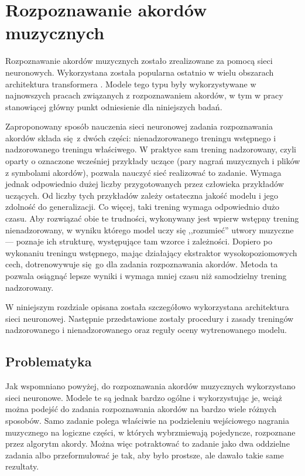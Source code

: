 \chapter{Rozpoznawanie akordów muzycznych}


Rozpoznawanie akordów muzycznych zostało zrealizowane za pomocą sieci neuronowych. Wykorzystana
została popularna ostatnio w wielu obszarach architektura transformera
\cite{vaswani_attention_2017}. Modele tego typu były wykorzystywane w najnowszych pracach związanych
z rozpoznawaniem akordów, w tym w pracy \cite{park_bi-directional_2019} stanowiącej główny punkt
odniesienie dla niniejszych badań.

Zaproponowany sposób nauczenia sieci neuronowej zadania rozpoznawania akordów składa się z dwóch
części: nienadzorowanego treningu wstępnego i nadzorowanego treningu właściwego. W praktyce sam
trening nadzorowany, czyli oparty o oznaczone wcześniej przykłady uczące (pary nagrań muzycznych i
plików z symbolami akordów), pozwala nauczyć sieć realizować to zadanie. Wymaga jednak odpowiednio
dużej liczby przygotowanych przez człowieka przykładów uczących. Od liczby tych przykładów zależy
ostateczna jakość modelu i jego zdolność do generalizacji. Co więcej, taki trening wymaga
odpowiednio dużo czasu. Aby rozwiązać obie te trudności, wykonywany jest wpierw wstępny trening
nienadzorowany, w wyniku którego model uczy się ,,rozumieć'' utwory muzyczne --- poznaje ich
strukturę, występujące tam wzorce i zależności. Dopiero po wykonaniu treningu wstępnego, mając
działający ekstraktor wysokopoziomowych cech, dotrenowywuje się go dla zadania rozpoznawania akordów.
Metoda ta pozwala osiągnąć lepsze wyniki i wymaga mniej czasu niż samodzielny trening nadzorowany.

W niniejszym rozdziale opisana została szczegółowo wykorzystana architektura sieci neuronowej.
Następnie przedstawione zostały procedury i zasady treningów nadzorowanego i nienadzorowanego oraz
reguły oceny wytrenowanego modelu.



\section{Problematyka}

Jak wspomniano powyżej, do rozpoznawania akordów muzycznych wykorzystano sieci neuronowe. Modele te
są jednak bardzo ogólne i wykorzystując je, wciąż można podejść do zadania rozpoznawania akordów na
bardzo wiele różnych sposobów. Samo zadanie polega właściwie na podzieleniu wejściowego nagrania
muzycznego na logiczne części, w których wybrzmiewają pojedyncze, rozpoznane przez algorytm akordy.
Można więc potraktować to zadanie jako dwa oddzielne zadania albo przeformułować je tak, aby było
prostsze, ale dawało takie same rezultaty. 

